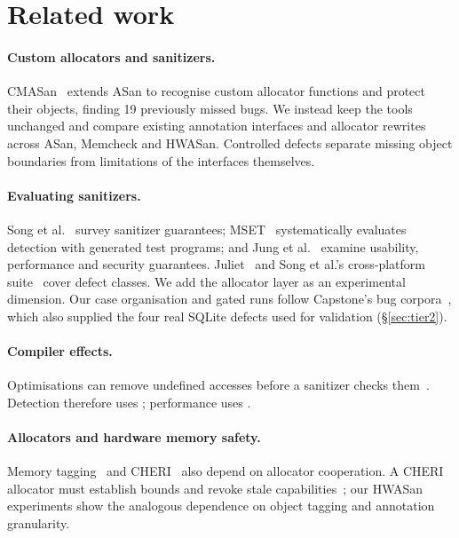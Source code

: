 \section{Related work}
\label{sec:related}

\paragraph{Custom allocators and sanitizers.} CMASan~\cite{hong2025cmasan} extends ASan to recognise custom allocator functions and protect their objects, finding 19 previously missed bugs. We instead keep the tools unchanged and compare existing annotation interfaces and allocator rewrites across ASan, Memcheck and HWASan. Controlled defects separate missing object boundaries from limitations of the interfaces themselves.

\paragraph{Evaluating sanitizers.} Song et al.~\cite{song2019sok} survey sanitizer guarantees; MSET~\cite{vintila2025mset} systematically evaluates detection with generated test programs; and Jung et al.~\cite{jung2025practice} examine usability, performance and security guarantees. Juliet~\cite{nist2017juliet} and Song et al.'s cross-platform suite~\cite{song2021testsuite} cover defect classes. We add the allocator layer as an experimental dimension. Our case organisation and gated runs follow Capstone's bug corpora~\cite{capstone}, which also supplied the four real SQLite defects used for validation (\S\ref{sec:tier2}).

\paragraph{Compiler effects.} Optimisations can remove undefined accesses before a sanitizer checks them~\cite{isemann2023ub}. Detection therefore uses ; performance uses .

\paragraph{Allocators and hardware memory safety.} Memory tagging~\cite{serebryany2018mte} and CHERI~\cite{watson2015cheri} also depend on allocator cooperation. A CHERI allocator must establish bounds and revoke stale capabilities~\cite{filardo2020cornucopia,bramley2023cheri}; our HWASan experiments show the analogous dependence on object tagging and annotation granularity.
